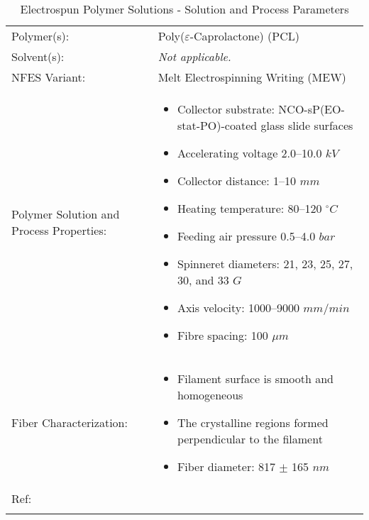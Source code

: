 \begin{table}[th]
\caption{Electrospun Polymer Solutions - Solution and Process Parameters}
\begin{center}
\begin{tabular}{
>{\raggedright\arraybackslash}p{}
>{\raggedright\arraybackslash}p{} }

\hline
Polymer(s): &
Poly($\varepsilon$-Caprolactone) (PCL) \\

\arrayrulecolor{lightgray}\hline
Solvent(s): &
\emph{Not applicable.} \\

\hline
NFES Variant: &
Melt Electrospinning Writing (MEW) \\

\hline
Polymer Solution and Process Properties: &
\begin{itemize}[leftmargin=*]
\item Collector substrate: NCO-sP(EO-stat-PO)-coated glass slide surfaces
\item Accelerating voltage 2.0–10.0 $k V$
\item Collector distance: 1–10 $m m$
\item Heating temperature: 80–120 $^\circ C$
\item Feeding air pressure 0.5–4.0 $bar$
\item Spinneret diameters: 21, 23, 25, 27, 30, and 33 $G$
\item Axis velocity: 1000–9000 $m m / min$
\item Fibre spacing: 100 $\mu m$
\end{itemize} \\

\hline
Fiber Characterization: &
\begin{itemize}[leftmargin=*]
\item Filament surface is smooth and homogeneous
\item The crystalline regions formed perpendicular to the filament
\item Fiber diameter: 817 $\pm$ 165 $n m$
\end{itemize} \\

\hline
Ref: & \cite{Dalton2015} \\ %
\arrayrulecolor{black}\hline
\label{tbl:FloresCompare}
\end{tabular}
\end{center}
\end{table}

